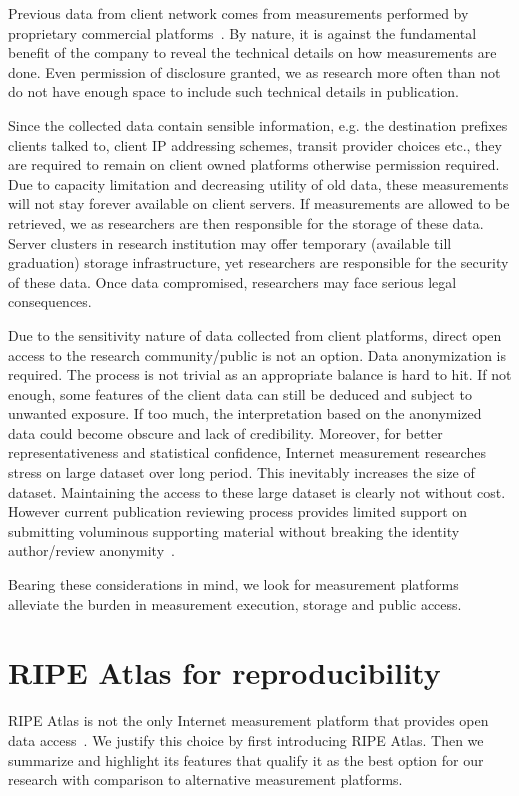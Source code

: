 Previous data from client network comes from measurements performed by proprietary commercial platforms~\cite{b6}.
By nature, it is against the fundamental benefit of the company to reveal the technical details on how measurements are done. Even permission of disclosure granted, we as research more often than not do not have enough space to include such technical details in publication.

Since the collected data contain sensible information, e.g. the destination prefixes clients talked to, client IP addressing schemes, transit provider choices etc., they are required to remain on client owned platforms otherwise permission required. Due to capacity limitation and decreasing utility of old data, these measurements will not stay forever available on client servers. If measurements are allowed to be retrieved, we as researchers are then responsible for the storage of these data. Server clusters in research institution may offer temporary (available till graduation) storage infrastructure, yet researchers are responsible for the security of these data. Once data compromised, researchers may face serious legal consequences.

Due to the sensitivity nature of data collected from client platforms, direct open access to the research community/public is not an option. Data anonymization is required. The process is not trivial as an appropriate balance is hard to hit. If not enough, some features of the client data can still be deduced and subject to unwanted exposure. If too much, the interpretation based on the anonymized data could become obscure and lack of credibility. Moreover, for better representativeness and statistical confidence, Internet measurement researches stress on large dataset over long period. This inevitably increases the size of dataset. Maintaining the access to these large dataset is clearly not without cost. However current publication reviewing process provides limited support on submitting voluminous supporting material without breaking the identity author/review anonymity~\cite{bajpai2017challenges}.

Bearing these considerations in mind, we look for measurement platforms alleviate the burden in measurement execution, storage and public access.

\section{RIPE Atlas for reproducibility}
RIPE Atlas is not the only Internet measurement platform that provides open data access~\cite{Bajpai2015}.
We justify this choice by first introducing RIPE Atlas. Then we summarize and highlight its features that qualify it as the best option for our research with comparison to alternative measurement platforms.

